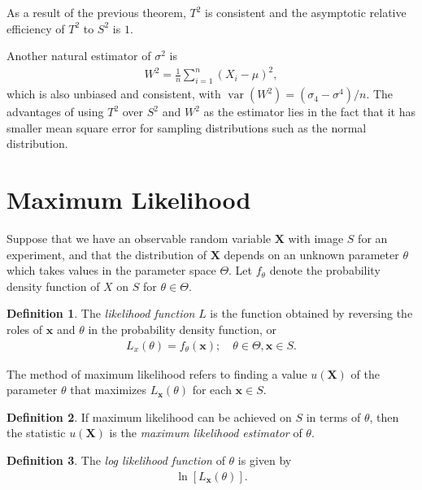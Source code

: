 \documentclass[a4paper,12pt]{article}
\theoremstyle{definition}
\theoremstyle{definition}
\theoremstyle{definition}
\newtheorem{definition}{Definition}[section]
\newcommand{\bs}{\boldsymbol}
\newcommand{\var}{\operatorname{var}}
\begin{document}
    As a result of the previous theorem, $T^2$ is consistent and the asymptotic relative efficiency of $T^2$ to $S^2$ is $1$. \par
    Another natural estimator of $\sigma^2$ is
    \begin{align*}
        W^2 = \frac{1}{n} \sum_{i = 1}^n (X_i - \mu)^2,
    \end{align*}
    which is also unbiased and consistent, with $\var \left( W^2 \right) = \left( \sigma_4 - \sigma^4 \right) / n$. The advantages of using $T^2$ over $S^2$ and $W^2$ as the estimator lies in the fact that it has smaller mean square error for sampling distributions such as the normal distribution.

\section{Maximum Likelihood}
    Suppose that we have an observable random variable $\bs{X}$ with image $S$ for an experiment, and that the distribution of $\bs{X}$ depends on an unknown parameter $\theta$ which takes values in the parameter space $\Theta$. Let $f_\theta$ denote the probability density function of $X$ on $S$ for $\theta \in \Theta$.
    \begin{definition}
        The \textit{likelihood function} $L$ is the function obtained by reversing the roles of $\bs{x}$ and $\theta$ in the probability density function, or
        \begin{align*}
            L_x(\theta) = f_\theta(\bs{x}); \quad \theta \in \Theta, \bs{x} \in S.
        \end{align*}
    \end{definition}
    The method of maximum likelihood refers to finding a value $u(\bs{X})$ of the parameter $\theta$ that maximizes $L_{\bs{x}}(\theta)$ for each $\bs{x} \in S$.
    \begin{definition}
        If maximum likelihood can be achieved on $S$ in terms of $\theta$, then the statistic $u(\bs{X})$ is the \textit{maximum likelihood estimator} of $\theta$.
    \end{definition}
    \begin{definition}
        The \textit{log likelihood function} of $\theta$ is given by
        \begin{align*}
            \ln[L_{\bs{x}}(\theta)].
        \end{align*}
    \end{definition}
\end{document}
